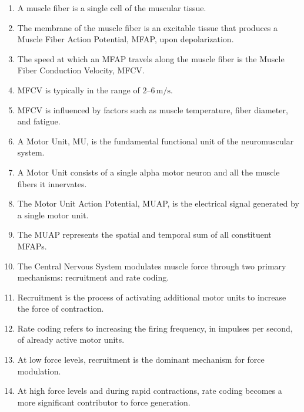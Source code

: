 \begin{enumerate}[label=\arabic*.]
    \item A muscle fiber is a single cell of the muscular tissue.
    
    \item The membrane of the muscle fiber is an excitable tissue that produces a Muscle Fiber Action Potential, MFAP, upon depolarization.
    
    \item The speed at which an MFAP travels along the muscle fiber is the Muscle Fiber Conduction Velocity, MFCV.
    
    \item MFCV is typically in the range of $2$--$6\,\text{m/s}$.
    
    \item MFCV is influenced by factors such as muscle temperature, fiber diameter, and fatigue.
    
    \item A Motor Unit, MU, is the fundamental functional unit of the neuromuscular system.
    
    \item A Motor Unit consists of a single alpha motor neuron and all the muscle fibers it innervates.
    
    \item The Motor Unit Action Potential, MUAP, is the electrical signal generated by a single motor unit.
    
    \item The MUAP represents the spatial and temporal sum of all constituent MFAPs.
    
    \item The Central Nervous System modulates muscle force through two primary mechanisms: recruitment and rate coding.
    
    \item Recruitment is the process of activating additional motor units to increase the force of contraction.
    
    \item Rate coding refers to increasing the firing frequency, in impulses per second, of already active motor units.
    
    \item At low force levels, recruitment is the dominant mechanism for force modulation.
    
    \item At high force levels and during rapid contractions, rate coding becomes a more significant contributor to force generation.
    

\end{enumerate}
